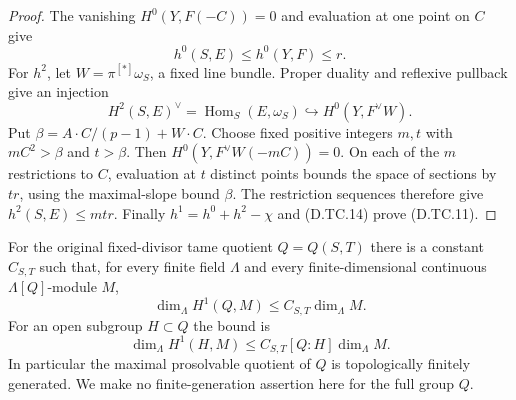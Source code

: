 \begin{proof}
The vanishing $H^0(Y,F(-C))=0$ and evaluation at one
point on $C$ give
\[
                             h^0(S,E)\le h^0(Y,F)\le r.
\]
For $h^2$, let $W=\pi^{[*]}\omega_S$, a fixed line bundle.
Proper duality and reflexive pullback give an injection
\[
 H^2(S,E)^\vee=\operatorname{Hom}_S(E,\omega_S)
                       \hookrightarrow H^0(Y,F^\vee W).
                                                        \tag{D.TC.17}
\]
Put $\beta=A\cdot C/(p-1)+W\cdot C$.
Choose fixed positive integers $m,t$ with
$mC^2>\beta$ and $t>\beta$.
Then $H^0(Y,F^\vee W(-mC))=0$.  On each of the
$m$ restrictions to $C$, evaluation at $t$ distinct
points bounds the space of sections by $tr$,
using the maximal-slope bound $\beta$.
The restriction sequences therefore give
$h^2(S,E)\le mtr$.  Finally
$h^1=h^0+h^2-\chi$ and (D.TC.14) prove (D.TC.11).
\end{proof}

\begin{theorem}
\label{D:tame-surface-all-characteristics-H1}
\label{D:surface-original-boundary-p-H1}
\label{D:surface-original-boundary-prosolvable}
For the original fixed-divisor tame quotient $Q=Q(S,T)$
there is a constant $C_{S,T}$ such that, for every finite
field $\Lambda$ and every finite-dimensional continuous
$\Lambda[Q]$-module $M$,
\[
                  \dim_\Lambda H^1(Q,M)
                              \le C_{S,T}\dim_\Lambda M.
                                                        \tag{D.TC.18}
\]
For an open subgroup $H\subset Q$ the bound is
\[
        \dim_\Lambda H^1(H,M)
                    \le C_{S,T}[Q:H]\dim_\Lambda M.       \tag{D.TC.19}
\]
In particular the maximal prosolvable quotient of $Q$
is topologically finitely generated.  We make no
finite-generation assertion here for the full group $Q$.
\end{theorem}

